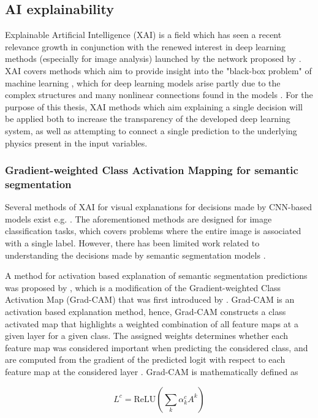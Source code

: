 \documentclass[../main/thesis.tex]{subfiles}
\begin{document}
\subsection{AI explainability}
Explainable Artificial Intelligence (XAI) is a field which has seen a recent relevance growth in conjunction with the renewed interest in deep learning methods (especially for image analysis) launched by the network proposed by \citet{Krizhevsky2012}. XAI covers methods which aim to provide insight into the "black-box problem" of machine learning \citep{Adadi2018}, which for deep learning models arise partly due to the complex structures and many nonlinear connections found in the models \citep{Lopes2022}. For the purpose of this thesis, XAI methods which aim explaining a single decision will be applied both to increase the transparency of the developed deep learning system, as well as attempting to connect a single prediction to the underlying physics present in the input variables.

\subsubsection{Gradient-weighted Class Activation Mapping for semantic segmentation}
\label{sec:seg-grad-cam}
Several methods of XAI for visual explanations for decisions made by CNN-based models exist e.g. \citep{Simonyan2013,Zhou2016,Selvaraju2016,Sundararajan2017,Lundberg2017}. The aforementioned methods are designed for image classification tasks, which covers problems where the entire image is associated with a single label. However, there has been limited work related to understanding the decisions made by semantic segmentation models \citep{Linardatos2020}.

A method for activation based explanation of semantic segmentation predictions was proposed by \citet{Vinogradova2020}, which is a modification of the Gradient-weighted Class Activation Map (Grad-CAM) that was first introduced by \citet{Selvaraju2016}. Grad-CAM is an activation based explanation method, hence, Grad-CAM constructs a class activated map that highlights a weighted combination of all feature maps at a given layer for a given class. The assigned weights determines whether each feature map was considered important when predicting the considered class, and are computed from the gradient of the predicted logit with respect to each feature map at the considered layer \citep{Selvaraju2016}. Grad-CAM is mathematically defined as

\begin{equation}
    \label{eq:gradcam}
    L^c = \text{ReLU}\left(\sum_k \alpha_k^c A^k\right)    
\end{equation}
\end{document}
